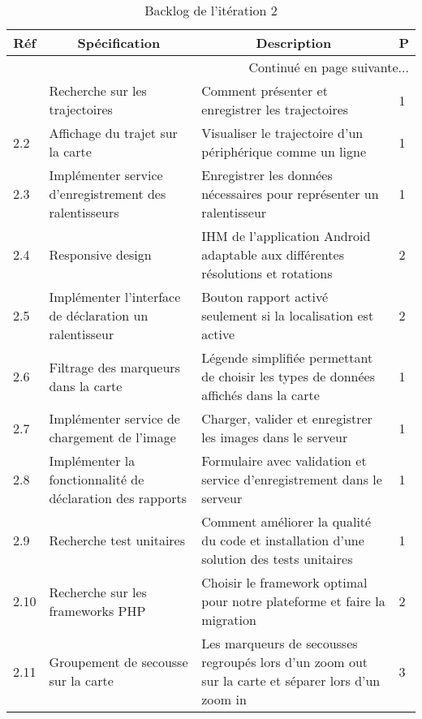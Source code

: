 \begin{center}
    \footnotesize
    \begin{longtable}{| p{1cm} | p{5cm} | p{7cm} | l |}
        \caption{Backlog de l'itération 2}
\label{tab:sprint2-backlog} \\

        \hline
        \multicolumn{1}{|c}{\textbf{Réf}} &
        \multicolumn{1}{|c}{\textbf{Spécification}} &
        \multicolumn{1}{|c}{\textbf{Description}} &
        \multicolumn{1}{|c|}{\textbf{P}} \\ \hline
        \endhead

        \hline \multicolumn{4}{|r|}{{Continué en page suivante$\dotsc$}} \\ \hline
        \endfoot

        \hline \hline
        \endlastfoot

        \hline
2.1 & Recherche sur les trajectoires & Comment présenter et enregistrer les trajectoires & 1 \\ \hline
2.2 & Affichage du trajet sur la carte & Visualiser le trajectoire d'un périphérique comme un ligne & 1 \\ \hline
2.3 & Implémenter service d'enregistrement des ralentisseurs & Enregistrer les données nécessaires pour représenter un ralentisseur & 1 \\ \hline
2.4 & Responsive design & IHM de l'application Android adaptable aux différentes résolutions et rotations & 2 \\ \hline
2.5 & Implémenter l'interface de déclaration un ralentisseur & Bouton rapport activé seulement si la localisation est active & 2 \\ \hline
2.6 & Filtrage des marqueurs dans la carte & Légende simplifiée permettant de choisir les types de données affichés dans la carte & 1 \\ \hline
2.7 & Implémenter service de chargement de l'image & Charger, valider et enregistrer les images dans le serveur & 1 \\ \hline
2.8 & Implémenter la fonctionnalité de déclaration des rapports & Formulaire avec validation et service d'enregistrement dans le serveur & 1 \\ \hline
2.9 & Recherche test unitaires & Comment améliorer la qualité du code et installation d'une solution des tests unitaires & 1 \\ \hline
2.10 & Recherche sur les frameworks PHP & Choisir le framework optimal pour notre plateforme et faire la migration & 2 \\ \hline
2.11 & Groupement de secousse sur la carte & Les marqueurs de secousses regroupés lors d'un zoom out sur la carte et séparer lors d'un zoom in & 3 \\ \hline
    \end{longtable}
\end{center}

